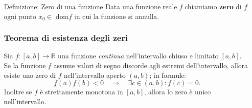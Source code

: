 \documentclass[x11names]{article}
\begin{document}
	\begin{center}
		\colorbox{myblue}{\begin{minipage}{5.75in}
				\begin{blues}{Definizione: Zero di una funzione}
					Data una funzione reale $f$ chiamiamo \textbf{zero} di $f$ ogni punto $x_0 \in$ dom$f$ in cui la funzione si annulla.
				\end{blues}
		\end{minipage}}        
	\end{center}
	
	\begin{center}
		\colorbox{myred}{\begin{minipage}{5.75in}
				\begin{redes}{}
					\subsubsection{Teorema di esistenza degli zeri}
					Sia $f:\left[a,b\right] \rightarrow \mathbb{R}$ una funzione \textit{continua} nell'intervallo chiuso e limitato $\left[a,b\right]$. Se la funzione $f$ assume valori di segno discorde agli estremi dell'intervallo, allora esiste uno zero  di $f$ nell'intervallo aperto $\left(a,b\right)$; in formule:
					\[
					f\left(a\right)f\left(b\right) < 0 \quad \Rightarrow \quad \exists c \in \left(a,b\right) : f\left(c\right) = 0
					.\] 
					Inoltre se $f$ è strettamente monotona in $\left[a,b\right]$, allora lo zero è unico nell'intervallo.
				\end{redes}
		\end{minipage}}        
	\end{center}
	\begin{center}
		
	\end{center}
	
\end{document}
